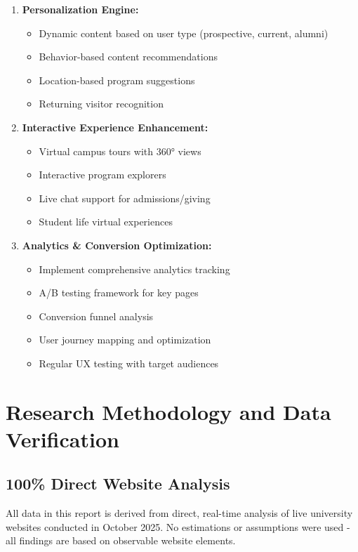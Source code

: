 \documentclass[12pt,letterpaper]{article}
\begin{document}
\begin{enumerate}[leftmargin=*]
    \item \textbf{Personalization Engine:}
    \begin{itemize}
        \item Dynamic content based on user type (prospective, current, alumni)
        \item Behavior-based content recommendations
        \item Location-based program suggestions
        \item Returning visitor recognition
    \end{itemize}

    \item \textbf{Interactive Experience Enhancement:}
    \begin{itemize}
        \item Virtual campus tours with 360° views
        \item Interactive program explorers
        \item Live chat support for admissions/giving
        \item Student life virtual experiences
    \end{itemize}

    \item \textbf{Analytics \& Conversion Optimization:}
    \begin{itemize}
        \item Implement comprehensive analytics tracking
        \item A/B testing framework for key pages
        \item Conversion funnel analysis
        \item User journey mapping and optimization
        \item Regular UX testing with target audiences
    \end{itemize}
\end{enumerate}

\section{Research Methodology and Data Verification}

\subsection{100\% Direct Website Analysis}

All data in this report is derived from direct, real-time analysis of live university websites conducted in October 2025. No estimations or assumptions were used - all findings are based on observable website elements.
\end{document}
